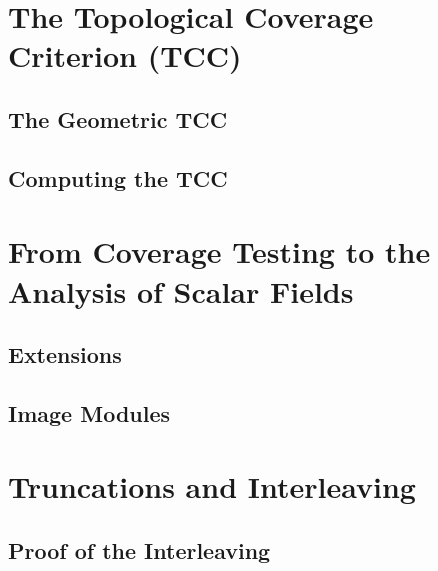 \documentclass[12pt]{article}
\begin{document}
\clearpage
\section{The Topological Coverage Criterion (TCC)}


\clearpage



\subsection{The Geometric TCC}\label{sec:geometric}


\subsection{Computing the TCC}
  


\clearpage
\section{From Coverage Testing to the Analysis of Scalar Fields}\label{sec:middle}
%


\subsection{Extensions}
  

\subsection{Image Modules}


\clearpage
\section{Truncations and Interleaving}\label{sec:interleaving}




\subsection{Proof of the Interleaving}
  
\end{document}
